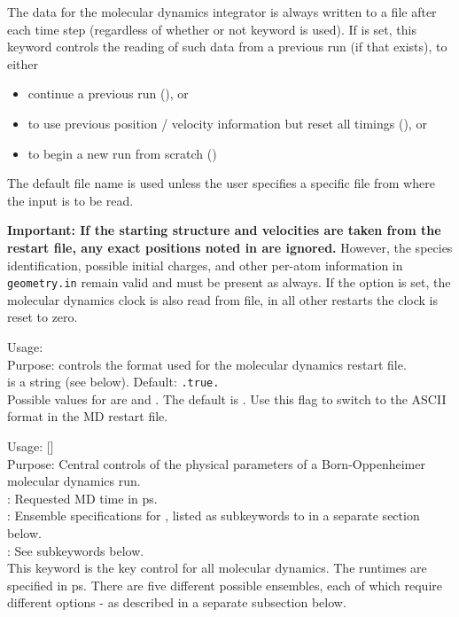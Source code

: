 The data for the molecular dynamics integrator is always written to a file  
 after each time step (regardless of whether or
not keyword  is used). 
If  is set, this keyword controls the reading of such
data from a previous run (if that exists), to either 
\begin{itemize}
  \item continue a previous run (), or
  \item to use previous position / velocity information
    but reset all timings (), or
  \item to begin a new run from scratch ()
\end{itemize} 
The default file name is used unless the user specifies a 
specific file  from where the input is to be read. 

\textbf{Important: If the starting structure and velocities are taken from 
the restart file, any exact positions noted in  are
ignored.} However, the species identification, possible initial charges, and
other per-atom information in \texttt{geometry.in} remain valid and must be
present as always. If the option  
is set, the molecular dynamics clock is also read from file, in all 
other restarts the clock is reset to zero. 

{\noindent
        Usage:   \\[1.0ex]
        Purpose: controls the format used for the molecular
          dynamics restart file. \\[1.0ex]
         is a string (see below). Default:
          \texttt{.true.} \\
} 
Possible values for  are  and . 
The default is . Use this flag to switch to the ASCII format 
in the MD restart file.


{\noindent
   Usage:   
     [] \\[1.0ex] 
   Purpose: Central controls of the physical parameters of a
     Born-Oppenheimer molecular dynamics run. \\[1.0ex]
    : Requested MD time in ps. \\
    : Ensemble specifications for ,
     listed as subkeywords to  in a separate section
     below. \\
   : See  subkeywords
     below. \\
} 
This keyword is the key control for all molecular dynamics. The
runtimes  are specified in ps. There are five different 
possible ensembles, each of which require different options - as
described in a separate subsection below.


